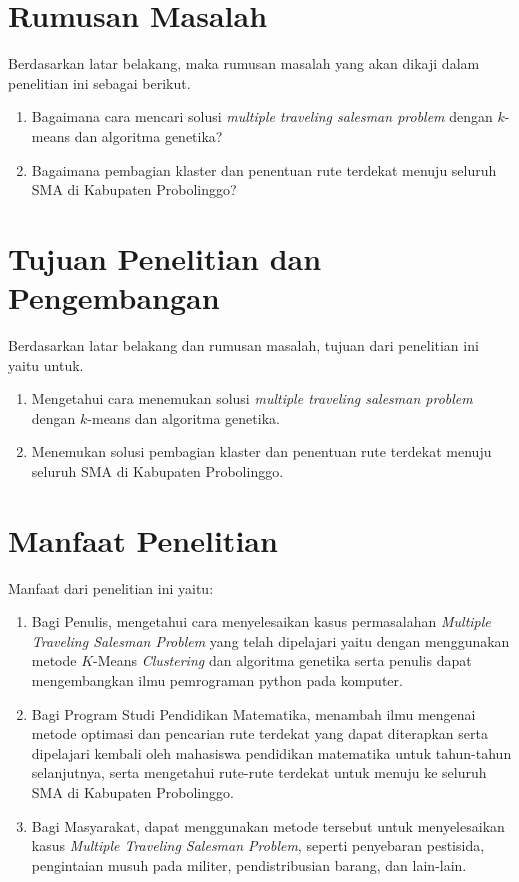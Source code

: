 \section{Rumusan Masalah}

Berdasarkan latar belakang, maka rumusan masalah yang akan dikaji dalam penelitian ini sebagai berikut.
\begin{enumerate}
    \item Bagaimana cara mencari solusi \textit{multiple traveling salesman problem} dengan $k$-means dan algoritma genetika?
    \item Bagaimana pembagian klaster dan penentuan rute terdekat menuju seluruh SMA di Kabupaten Probolinggo?
\end{enumerate}

\section{Tujuan Penelitian dan Pengembangan}

Berdasarkan latar belakang dan rumusan masalah, tujuan dari penelitian ini yaitu untuk.
\begin{enumerate}
	\item Mengetahui cara menemukan solusi \textit{multiple traveling salesman problem} dengan $k$-means dan algoritma genetika.
	\item Menemukan solusi pembagian klaster dan penentuan rute terdekat menuju seluruh SMA di Kabupaten Probolinggo.
\end{enumerate}

\section{Manfaat Penelitian}

Manfaat dari penelitian ini yaitu:
\begin{enumerate}
	\item Bagi Penulis, mengetahui cara menyelesaikan kasus permasalahan \textit{Multiple Traveling Salesman Problem} yang telah dipelajari yaitu dengan menggunakan metode $K$-Means \textit{Clustering} dan algoritma genetika serta penulis dapat mengembangkan ilmu pemrograman python pada komputer.

	\item Bagi Program Studi Pendidikan Matematika, menambah ilmu mengenai metode optimasi dan pencarian rute terdekat yang dapat diterapkan serta dipelajari kembali oleh mahasiswa pendidikan matematika untuk tahun-tahun selanjutnya, serta mengetahui rute-rute terdekat untuk menuju ke seluruh SMA di Kabupaten Probolinggo.
	
	\item Bagi Masyarakat, dapat menggunakan metode tersebut untuk menyelesaikan kasus \textit{Multiple Traveling Salesman Problem}, seperti penyebaran pestisida, pengintaian musuh pada militer, pendistribusian barang, dan lain-lain.
	
\end{enumerate}

